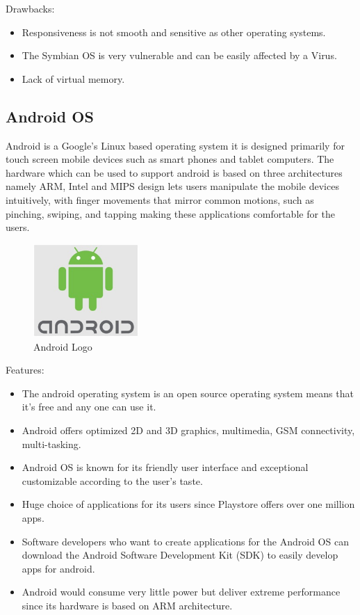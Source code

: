 \documentclass[11pt,a4paper,twoside]{article}
\begin{document}
Drawbacks:
\begin{itemize}
    \item Responsiveness is not smooth and sensitive as other operating systems.
\item The Symbian OS is very vulnerable and can be easily affected by a Virus.
\item Lack of virtual memory.
\end{itemize}
\subsection{Android OS}
Android is a Google’s Linux based operating system it is designed primarily for touch screen mobile devices such as smart phones and tablet computers. The hardware which can be used to support android is based on three architectures namely ARM, Intel and MIPS design lets users manipulate the mobile devices intuitively, with finger movements that mirror common motions, such as pinching, swiping, and tapping making these applications comfortable for the users.\\
\begin{figure}
\includegraphics[width=4cm]{Fig 8.jpg}
\caption{Android Logo}
\end{figure}
Features:
\begin{itemize}
    \item The android operating system is an open source operating system means that it’s free and any one can use it.
\item Android offers optimized 2D and 3D graphics, multimedia, GSM connectivity, multi-tasking.
\item Android OS is known for its friendly user interface and exceptional customizable according to the user’s taste.
\item Huge choice of applications for its users since Playstore offers over one million apps.
\item Software developers who want to create applications for the Android OS can download the Android Software Development Kit (SDK) to easily develop apps for android.
\item Android would consume very little power but deliver extreme performance since its hardware is based on ARM architecture.
\end{itemize}
\end{document}
